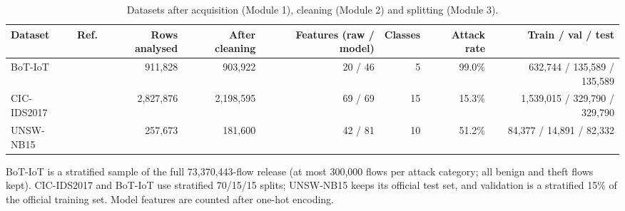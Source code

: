 \begin{table}[t]
\centering
\caption{Datasets after acquisition (Module 1), cleaning (Module 2) and splitting (Module 3).}
\label{tab:datasets}
\footnotesize
\setlength{\tabcolsep}{3.5pt}
\begin{adjustbox}{max width=\linewidth}
\begin{tabular}{llrrrrrr}
\toprule
Dataset & Ref. & Rows analysed & After cleaning & Features (raw / model) & Classes & Attack rate & Train / val / test \\
\midrule
BoT-IoT & \cite{koroniotis2019botiot} & 911,828 & 903,922 & 20 / 46 & 5 & 99.0\% & 632,744 / 135,589 / 135,589 \\
CIC-IDS2017 & \cite{sharafaldin2018cicids} & 2,827,876 & 2,198,595 & 69 / 69 & 15 & 15.3\% & 1,539,015 / 329,790 / 329,790 \\
UNSW-NB15 & \cite{moustafa2015unsw} & 257,673 & 181,600 & 42 / 81 & 10 & 51.2\% & 84,377 / 14,891 / 82,332 \\
\bottomrule
\end{tabular}
\end{adjustbox}
\par\vspace{2pt}
\parbox{0.95\linewidth}{\scriptsize BoT-IoT is a stratified sample of the full 73,370,443-flow release (at most 300,000 flows per attack category; all benign and theft flows kept). CIC-IDS2017 and BoT-IoT use stratified 70/15/15 splits; UNSW-NB15 keeps its official test set, and validation is a stratified 15\% of the official training set. Model features are counted after one-hot encoding.}
\end{table}
